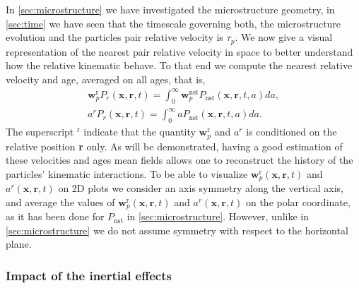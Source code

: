 
In \ref{sec:microstructure} we have investigated the microstructure geometry, 
in \ref{sec:time} we have seen that the timescale governing both, the microstructure evolution and the particles pair relative velocity is $\tau_p$.   
We now give a visual representation of the nearest pair relative velocity in space to better understand how the relative kinematic behave.  
To that end we compute the nearest relative velocity and age, averaged on all ages, that is,
\begin{align*}
    \textbf{w}^\text{r}_pP_r(\textbf{x},\textbf{r},t)
    =\int_0^\infty \textbf{w}^\text{nst}_pP_\text{nst}(\textbf{x},\textbf{r},t,a) da,\\
    a^rP_r(\textbf{x},\textbf{r},t)
    =\int_0^\infty a P_\text{nst}(\textbf{x},\textbf{r},t,a) da.
\end{align*}
The superscript $^\text{r}$ indicate that the quantity $\textbf{w}^\text{r}_p$ and $a^r$ is conditioned on the relative position \textbf{r} only.
As will be demonstrated, having a good estimation of these velocities and ages mean fields allows one to reconstruct the history of the particles' kinematic interactions. 
To be able to visualize
$\textbf{w}^\text{r}_p(\textbf{x},\textbf{r},t)$
and 
$a^r(\textbf{x},\textbf{r},t)$
on 2D plots we consider an axis symmetry along the vertical axis, and average the values of 
$\textbf{w}^\text{r}_p(\textbf{x},\textbf{r},t)$
and $a^r(\textbf{x},\textbf{r},t)$
on the polar coordinate, as it has been done for $P_\text{nst}$ in \ref{sec:microstructure}. 
However, unlike in \ref{sec:microstructure} we do not assume symmetry with respect to the horizontal plane. 

\subsubsection*{Impact of the inertial effects}

